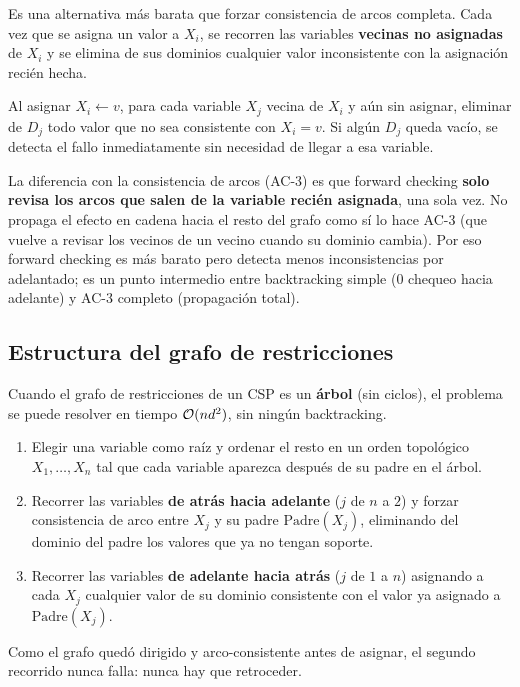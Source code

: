 Es una alternativa más barata que forzar consistencia de arcos completa. Cada vez que se asigna un valor a $X_i$, se recorren
las variables \textbf{vecinas no asignadas} de $X_i$ y se elimina de sus dominios cualquier valor inconsistente con la asignación
recién hecha.

\begin{definition}
    Al asignar $X_i \leftarrow v$, para cada variable $X_j$ vecina de $X_i$ y aún sin asignar, eliminar de $D_j$ todo valor
    que no sea consistente con $X_i = v$. Si algún $D_j$ queda vacío, se detecta el fallo inmediatamente sin necesidad de
    llegar a esa variable.
\end{definition}

La diferencia con la consistencia de arcos (AC-3) es que forward checking \textbf{solo revisa los arcos que salen de la
variable recién asignada}, una sola vez. No propaga el efecto en cadena hacia el resto del grafo como sí lo hace AC-3
(que vuelve a revisar los vecinos de un vecino cuando su dominio cambia). Por eso forward checking es más barato pero
detecta menos inconsistencias por adelantado; es un punto intermedio entre backtracking simple ($0$ chequeo hacia
adelante) y AC-3 completo (propagación total).

\subsection{Estructura del grafo de restricciones}

Cuando el grafo de restricciones de un CSP es un \textbf{árbol} (sin ciclos), el problema se puede resolver en tiempo
$\mathcal{O}(nd^2)$, sin ningún backtracking.

\begin{definition}
    \begin{enumerate}
        \item Elegir una variable como raíz y ordenar el resto en un orden topológico $X_1, \ldots, X_n$ tal que cada
        variable aparezca después de su padre en el árbol.
        \item Recorrer las variables \textbf{de atrás hacia adelante} ($j$ de $n$ a $2$) y forzar consistencia de arco
        entre $X_j$ y su padre $\text{Padre}(X_j)$, eliminando del dominio del padre los valores que ya no tengan soporte.
        \item Recorrer las variables \textbf{de adelante hacia atrás} ($j$ de $1$ a $n$) asignando a cada $X_j$ cualquier
        valor de su dominio consistente con el valor ya asignado a $\text{Padre}(X_j)$.
    \end{enumerate}
    Como el grafo quedó dirigido y arco-consistente antes de asignar, el segundo recorrido nunca falla: nunca hay que
    retroceder.
\end{definition}


